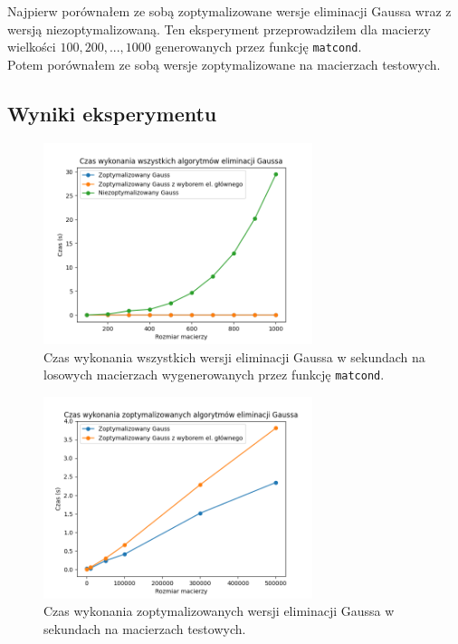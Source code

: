 \documentclass{article}
\begin{document}
Najpierw porównałem ze sobą zoptymalizowane wersje eliminacji Gaussa wraz z wersją niezoptymalizowaną.
Ten eksperyment przeprowadziłem dla macierzy wielkości $100, 200, ..., 1000$ generowanych przez funkcję \texttt{matcond}.\\

Potem porównałem ze sobą wersje zoptymalizowane na macierzach testowych.

\subsection{Wyniki eksperymentu}
\begin{figure}[H]
\centering
\includegraphics[width=0.70\textwidth]{allTimePlot.png}
\caption{Czas wykonania wszystkich wersji eliminacji Gaussa w sekundach na losowych macierzach wygenerowanych przez funkcję \texttt{matcond}.}
\end{figure}

\begin{figure}[H]
\centering
\includegraphics[width=0.70\textwidth]{timePlot.png}
\caption{Czas wykonania zoptymalizowanych wersji eliminacji Gaussa w sekundach na macierzach testowych.}
\end{figure}
\end{document}
